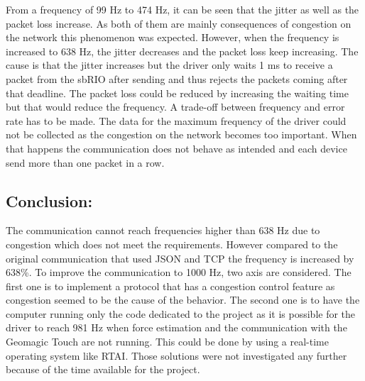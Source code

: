 From a frequency of 99 Hz to 474 Hz, it can be seen that the jitter as well as the packet loss increase. As both of them are mainly consequences of congestion on the network\cite{cisco_jitter} this phenomenon was expected. However, when the frequency is increased to 638 Hz, the jitter decreases and the packet loss keep increasing. The cause is that the jitter increases but the driver only waits 1 ms to receive a packet from the sbRIO after sending and thus rejects the packets coming after that deadline. The packet loss could be reduced by increasing the waiting time but that would reduce the frequency. A trade-off between frequency and error rate has to be made.
The data for the maximum frequency of the driver could not be collected as the congestion on the network becomes too important. When that happens the communication does not behave as intended and each device send more than one packet in a row.

\subsection*{Conclusion:}

The communication cannot reach frequencies higher than 638 Hz due to congestion which does not meet the requirements. However  compared to the original communication that used JSON and TCP the frequency is increased by 638\%. 
To improve the communication to 1000 Hz, two axis are considered. The first one is to implement a protocol that has a congestion control feature as congestion seemed to be the cause of the behavior. The second one is to have the computer running only the code dedicated to the project as it is possible for the driver to reach 981 Hz when force estimation and the communication with the Geomagic Touch are not running. This could be done by using a real-time operating system like RTAI. Those solutions were not investigated any further because of the time available for the project.
